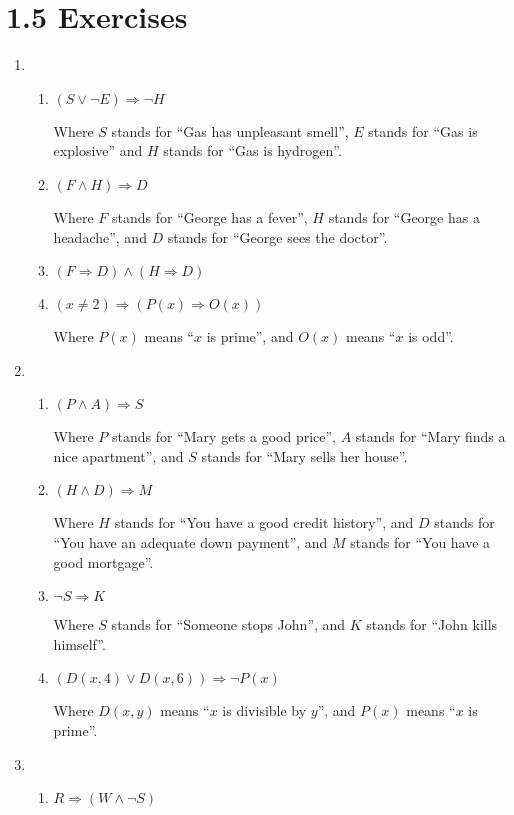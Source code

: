 \documentclass{article}
\begin{document}
\section*{1.5 Exercises}
\begin{enumerate}
\item
  \begin{enumerate}
  \item $(S \lor \lnot E) \Rightarrow \lnot H$

    Where $S$ stands for ``Gas has unpleasant smell'', $E$ stands for ``Gas is explosive'' and $H$ stands for ``Gas is hydrogen''.

  \item $(F \land H) \Rightarrow D$

    Where $F$ stands for ``George has a fever'', $H$ stands for ``George has a headache'', and $D$ stands for ``George sees the doctor''.

  \item $(F \Rightarrow D) \land (H \Rightarrow D)$
  \item $(x \neq 2) \Rightarrow (P(x) \Rightarrow O(x))$

    Where $P(x)$ means ``$x$ is prime'', and $O(x)$ means ``$x$ is odd''.
  \end{enumerate}
\item
  \begin{enumerate}
  \item $(P \land A) \Rightarrow S$

    Where $P$ stands for ``Mary gets a good price'', $A$ stands for ``Mary finds a nice apartment'', and $S$ stands for ``Mary sells her house''.

  \item $(H \land D) \Rightarrow M$

    Where $H$ stands for ``You have a good credit history'', and $D$ stands for ``You have an adequate down payment'', and $M$ stands for ``You have a good mortgage''.

  \item $\lnot S \Rightarrow K$

    Where $S$ stands for ``Someone stops John'', and $K$ stands for ``John kills himself''.

  \item $(D(x,4) \lor D(x,6)) \Rightarrow \lnot P(x)$

    Where $D(x,y)$ means ``$x$ is divisible by $y$'', and $P(x)$ means ``$x$ is prime''.
  \end{enumerate}
\item
  \begin{enumerate}
\item $R \Rightarrow (W \land \lnot S)$


\end{enumerate}
\end{enumerate}
\end{document}

